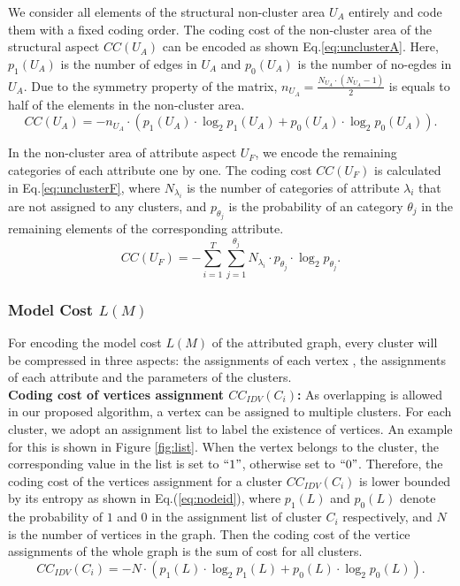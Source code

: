 We consider all elements of the structural non-cluster area $U_A$ entirely and code them with a fixed coding order. The coding cost of the non-cluster area of the structural aspect $CC(U_A)$ can be encoded as shown Eq.\ref{eq:unclusterA}. Here, $p_1(U_A)$ is the number of edges in $U_A$ and $p_0(U_A)$ is the number of no-egdes in $U_A$. Due to the symmetry property of the matrix, $n_{U_A} = \frac{N_{U_A}\cdot(N_{U_A}-1)}{2}$ is equals to half of the elements in the non-cluster area. 
\begin{equation}
CC(U_A)= -n_{U_A}\cdot (p_1(U_A)\cdot \log_2 p_1(U_A) + p_0(U_A) \cdot \log_2 p_0(U_A)).
\label{eq:unclusterA}
\end{equation}

In the non-cluster area of attribute aspect $U_F$, we encode the remaining categories of each attribute one by one. The coding cost $CC(U_F)$ is calculated in Eq.\ref{eq:unclusterF}, where $N_{\lambda_i}$ is the number of categories of attribute $\lambda_i$ that are not assigned to any clusters, and $p_{\theta_j}$ is the probability of an category $\theta_j$ in the remaining elements of the corresponding attribute. 
\begin{equation}
CC(U_F)= -\sum^T_{i=1}\sum^{\theta_j}_{j=1} N_{\lambda_i}\cdot p_{\theta_j}\cdot \log_2 p_{\theta_j} .
\label{eq:unclusterF}
\end{equation}

\subsubsection{Model Cost $L(M)$}
\noindent For encoding the model cost $L(M)$ of the attributed graph, every cluster will be compressed in three aspects: the assignments of each vertex , the  assignments of each attribute and the parameters of the clusters.
\\

\noindent \textbf{Coding cost of vertices assignment $CC_{IDV}(C_i)$: } As overlapping is allowed in our proposed algorithm, a vertex can be assigned to multiple clusters. For each cluster, we adopt an assignment list to label the existence of vertices. An example for this is shown in Figure \ref{fig:list}. When the vertex belongs to the cluster, the corresponding value in the list is set to $``1"$, otherwise set to $``0"$. Therefore, the coding cost of the vertices assignment for a cluster $CC_{IDV}(C_i)$ is lower bounded by its entropy as shown in Eq.(\ref{eq:nodeid}), where $p_{1}(L)$ and $p_{0}(L)$ denote the probability of $1$ and $0$ in the assignment list of cluster $C_i$ respectively, and $N$ is the number of vertices in the graph. Then the coding cost of the vertice assignments of the whole graph is the sum of cost for all clusters.
\begin{equation}
CC_{IDV}(C_i)= - N \cdot ( p_{1}(L) \cdot \log_2 {p_{1}(L)} +  p_{0}(L) \cdot \log_2 {p_{0}(L)}).
\label{eq:nodeid}
\end{equation}

